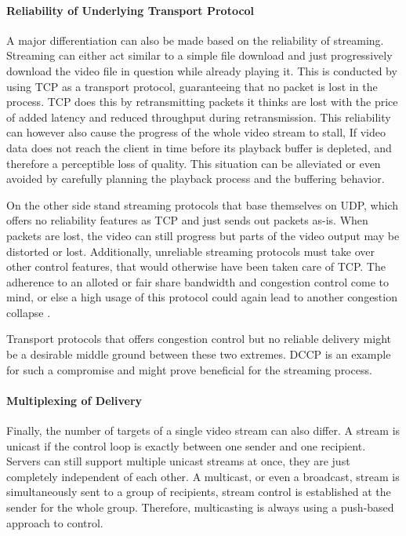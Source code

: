 \paragraph{Reliability of Underlying Transport Protocol} %
A major differentiation can also be made based on the reliability of streaming. Streaming can either act similar to a simple file download and just progressively download the video file in question while already playing it. This is conducted by using \gls{TCP} as a transport protocol, guaranteeing that no packet is lost in the process. \gls{TCP} does this by retransmitting packets it thinks are lost with the price of added latency and reduced throughput during retransmission. This reliability can however also cause the progress of the whole video stream to stall, If video data does not reach the client in time before its playback buffer is depleted, and therefore a perceptible loss of quality. This situation can be alleviated or even avoided by carefully planning the playback process and the buffering behavior.

On the other side stand streaming protocols that base themselves on \gls{UDP}, which offers no reliability features as \gls{TCP} and just sends out packets as-is. When packets are lost, the video can still progress but parts of the video output may be distorted or lost. Additionally, unreliable streaming protocols must take over other control features, that would otherwise have been taken care of \gls{TCP}. The adherence to an alloted or fair share bandwidth and congestion control come to mind, or else a high usage of this protocol could again lead to another congestion collapse \cite{rfc896}.

Transport protocols that offers congestion control but no reliable delivery might be a desirable middle ground between these two extremes. \gls{DCCP} \cite{kohler2006designing} is an example for such a compromise and might prove beneficial for the streaming process.


\paragraph{Multiplexing of Delivery} %
Finally, the number of targets of a single video stream can also differ. A stream is unicast if the control loop is exactly between one sender and one recipient. Servers can still support multiple unicast streams at once, they are just completely independent of each other. A multicast, or even a broadcast, stream is simultaneously sent to a group of recipients, stream control is established at the sender for the whole group. Therefore, multicasting is always using a push-based approach to control.


